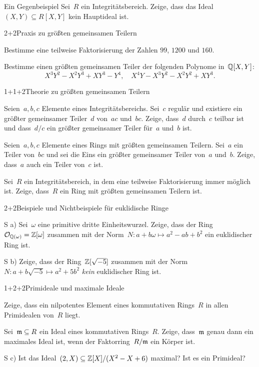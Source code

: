 \documentclass{algblatt}
\begin{document}

\begin{aufgabe}{3}{Ein Gegenbeispiel}
Sei~$R$ ein Integritätsbereich. Zeige, dass das Ideal~$(X,Y) \subseteq R[X,Y]$
kein Hauptideal ist.
\end{aufgabe}

\begin{aufgabeE}{2+2}{Praxis zu größten gemeinsamen Teilern}
\item Bestimme eine teilweise Faktorisierung der Zahlen $99$, $1200$ und $160$.
\item Bestimme einen größten gemeinsamen Teiler der folgenden Polynome
in~$\mathbb{Q}[X,Y]$:
\[ X^3Y^2 - X^2Y^3 + XY^3 - Y^4, \quad X^4Y - X^3Y^2 - X^2Y^2 + XY^3. \]
\end{aufgabeE}
\vspace{-1em}

\begin{aufgabeE}{1+1+2}{Theorie zu größten gemeinsamen Teilern}
\item Seien~$a,b,c$ Elemente eines Integritätsbereichs. Sei~$c$ regulär und
existiere ein größter gemeinsamer Teiler~$d$ von~$ac$ und~$bc$. Zeige, dass~$d$
durch~$c$ teilbar ist und dass~$d/c$ ein größter gemeinsamer Teiler für~$a$
und~$b$ ist.
\item Seien~$a,b,c$ Elemente eines Rings mit größten gemeinsamen Teilern.
Sei~$a$ ein Teiler von~$b c$ und sei die Eins ein größter gemeinsamer
Teiler von~$a$ und~$b$. Zeige, dass~$a$ auch ein Teiler von~$c$ ist.
\item Sei~$R$ ein Integritätsbereich, in dem eine teilweise Faktorisierung
immer möglich ist. Zeige, dass~$R$ ein Ring mit größten gemeinsamen Teilern
ist.
\end{aufgabeE}

\begin{aufgabeE}{2+2}{Beispiele und Nichtbeispiele für euklidische Ringe}
\item[S a)] Sei~$\omega$ eine primitive dritte Einheitswurzel. Zeige, dass der
Ring~$\mathcal{O}_{\mathbb{Q}(\omega)} = \mathbb{Z}[\omega]$ zusammen mit der Norm~$N : a+b\omega
\mapsto a^2 - ab + b^2$ ein euklidischer Ring ist.
\item[S b)] Zeige, dass der Ring~$\mathbb{Z}[\sqrt{-5}]$ zusammen mit der Norm~$N :
a+b\sqrt{-5} \mapsto a^2 + 5b^2$ \emph{kein} euklidischer Ring ist.
\end{aufgabeE}

\begin{aufgabeE}{1+2+2}{Primideale und maximale Ideale}
\item Zeige, dass ein nilpotentes Element eines kommutativen Rings~$R$ in allen
Primidealen von~$R$ liegt.
\item Sei~$\mathfrak{m} \subseteq R$ ein Ideal eines kommutativen Rings~$R$. Zeige,
dass~$\mathfrak{m}$ genau dann ein maximales Ideal ist, wenn der Faktorring~$R/\mathfrak{m}$ ein
Körper ist.
\item[S c)] Ist das Ideal~$(2, X) \subseteq \mathbb{Z}[X]/(X^2-X+6)$ maximal? Ist es ein
Primideal?
\end{aufgabeE}
\end{document}
